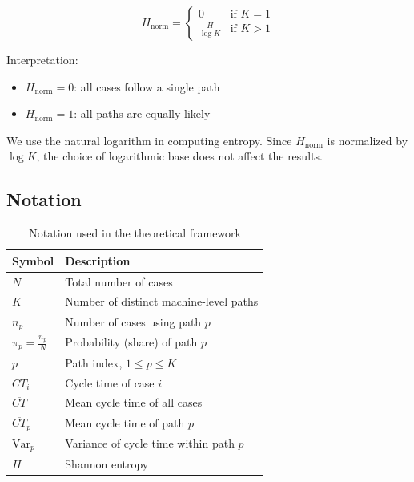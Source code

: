 \documentclass[
]{ceurart}
\begin{document}
\begin{equation}
H_{\text{norm}} =
\begin{cases}
0 & \text{if } K = 1 \\
\frac{H}{\log K} & \text{if } K > 1
\end{cases}
\end{equation}

Interpretation:
\begin{itemize}
    \item $H_{\text{norm}} = 0$: all cases follow a single path
    \item $H_{\text{norm}} = 1$: all paths are equally likely
\end{itemize}
We use the natural logarithm in computing entropy. Since $H_{\text{norm}}$ is normalized by $\log K$, the choice of logarithmic base does not affect the results.

\subsection{Notation}

\begin{table}[h]
\centering
\begin{tabular}{ll}
\hline
Symbol & Description \\
\hline
$N$ & Total number of cases \\
$K$ & Number of distinct machine-level paths \\
$n_p$ & Number of cases using path $p$ \\
$\pi_p = \frac{n_p}{N}$ & Probability (share) of path $p$ \\
$p$ & Path index, $1 \leq p \leq K$ \\
$CT_i$ & Cycle time of case $i$ \\
$\overline{CT}$ & Mean cycle time of all cases \\
$\overline{CT}_p$ & Mean cycle time of path $p$ \\
$\mathrm{Var}_p$ & Variance of cycle time within path $p$ \\
$H$ & Shannon entropy \\
\hline
\end{tabular}
\caption{Notation used in the theoretical framework}
\end{table}
\end{document}
